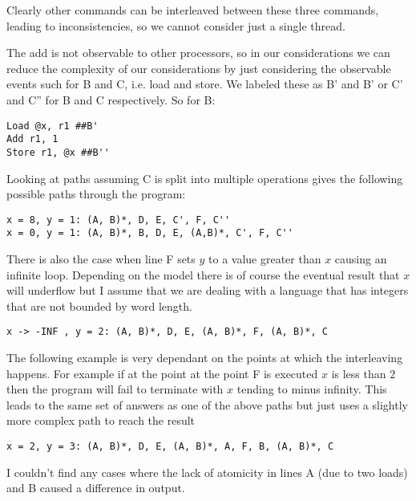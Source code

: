 \documentclass[11pt,a4paper]{article}
\begin{document}
Clearly other commands can be interleaved between these three commands,
leading to inconsistencies, so we cannot consider just a single thread.

The add is not observable to other processors, so in our considerations
we can reduce the complexity of our considerations by just considering
the observable events such for B and C, i.e. load and store. We labeled
these as B' and B' or C' and C'' for B and C respectively. So for B:

\begin{verbatim}
Load @x, r1 ##B'
Add r1, 1
Store r1, @x ##B''
\end{verbatim}

Looking at paths assuming C is split into multiple operations gives the following
possible paths through the program:

\begin{verbatim}
x = 8, y = 1: (A, B)*, D, E, C', F, C''
x = 0, y = 1: (A, B)*, B, D, E, (A,B)*, C', F, C''
\end{verbatim}

There is also the case when line F sets $y$ to a value greater than $x$
causing an infinite loop. Depending on the model there is of course the
eventual result that $x$ will underflow but I assume that we are dealing with a
language that has integers that are not bounded by word length.

\begin{verbatim}
x -> -INF , y = 2: (A, B)*, D, E, (A, B)*, F, (A, B)*, C
\end{verbatim}

The following example is very dependant on the points at which the
interleaving happens. For example if at the point at the point F is
executed $x$ is less than $2$ then the program will fail to terminate with $x$
tending to minus infinity. This leads to the same set of answers as one
of the above paths but just uses a slightly more complex path to reach
the result

\begin{verbatim}
x = 2, y = 3: (A, B)*, D, E, (A, B)*, A, F, B, (A, B)*, C
\end{verbatim}

I couldn't find any cases where the lack of atomicity in lines A (due to two loads)
and B caused a difference in output.
\end{document}
